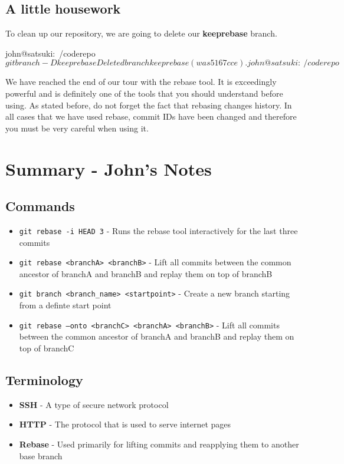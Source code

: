 \subsection{A little housework}
To clean up our repository, we are going to delete our \textbf{keeprebase} branch.

\begin{code}
john@satsuki:~/coderepo$ git branch -D keeprebase
Deleted branch keeprebase (was 5167cce).
john@satsuki:~/coderepo$
\end{code}

We have reached the end of our tour with the rebase tool.
It is exceedingly powerful and is definitely one of the tools that you should understand before using.
As stated before, do not forget the fact that rebasing changes history.
In all cases that we have used rebase, commit IDs have been changed and therefore you must be very careful when using it.

\clearpage
\section{Summary - John's Notes}
\subsection{Commands}
\begin{itemize}
\item\texttt{git rebase -i HEAD~3} - Runs the rebase tool interactively for the last three commits
\item\texttt{git rebase <branchA> <branchB>} - Lift all commits between the common ancestor of branchA and branchB and replay them on top of branchB
\item\texttt{git branch <branch\_name> <startpoint>} - Create a new branch starting from a definte start point
\item\texttt{git rebase --onto <branchC> \newline <branchA> <branchB>} - Lift all commits between the common ancestor of branchA and branchB and replay them on top of branchC
\end{itemize}

\subsection{Terminology}
\begin{itemize}
\item\textbf{SSH} - A type of secure network protocol
\item\textbf{HTTP} - The protocol that is used to serve internet pages
\item\textbf{Rebase} - Used primarily for lifting commits and reapplying them to another base branch
\end{itemize}
